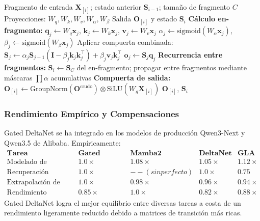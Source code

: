\documentclass[11pt,a4paper]{article}
\begin{document}
\begin{algorithm}[H]
\caption{Paso Adelante Paralelo por Fragmentos de Gated DeltaNet}
\begin{algorithmic}[1]
\Require Fragmento de entrada $\mathbf{X}_{[i]}$; estado anterior $\mathbf{S}_{i-1}$; tamaño de fragmento $C$
\Require Proyecciones: $W_q, W_k, W_v, W_\alpha, W_\beta$
\Ensure Salida $\mathbf{O}_{[i]}$ y estado $\mathbf{S}_i$
\State \textbf{Cálculo en-fragmento:}
    \State $\mathbf{q}_j \gets W_q \mathbf{x}_j$, $\mathbf{k}_j \gets W_k \mathbf{x}_j$, $\mathbf{v}_j \gets W_v \mathbf{x}_j$
    \State $\alpha_j \gets \text{sigmoid}(W_\alpha \mathbf{x}_j)$, $\beta_j \gets \text{sigmoid}(W_\beta \mathbf{x}_j)$
    \State Aplicar compuerta combinada: $\mathbf{S}_j \gets \alpha_j \mathbf{S}_{j-1}(\mathbf{I} - \beta_j \mathbf{k}_j \mathbf{k}_j^\top) + \beta_j \mathbf{v}_j \mathbf{k}_j^\top$
    \State $\mathbf{o}_j \gets \mathbf{S}_j \mathbf{q}_j$
\EndFor
\State \textbf{Recurrencia entre fragmentos:}
\State $\mathbf{S}_i \gets \mathbf{S}_C$ del en-fragmento; propagar entre fragmentos mediante máscaras $\prod \alpha$ acumulativas
\State \textbf{Compuerta de salida:} $\mathbf{O}_{[i]} \gets \text{GroupNorm}(\mathbf{O}^\text{crudo}) \otimes \text{SiLU}(W_g \mathbf{X}_{[i]})$
\Return $\mathbf{O}_{[i]}$, $\mathbf{S}_i$
\end{algorithmic}
\end{algorithm}

\subsubsection{Rendimiento Empírico y Compensaciones}

Gated DeltaNet se ha integrado en los modelos de producción Qwen3-Next y Qwen3.5 de Alibaba. Empíricamente:
\[
\begin{array}{l|cccc}
\textbf{Tarea} & \textbf{Gated DeltaNet} & \textbf{Mamba2} & \textbf{DeltaNet} & \textbf{GLA} \\
\hline
\text{Modelado de Lenguaje} & \mathbf{1.0\times} & 1.08\times & 1.05\times & 1.12\times \\
\text{Recuperación Asociativa} & \mathbf{1.0\times} & --(sin perfecto) & \mathbf{1.0\times} & 0.75 \\
\text{Extrapolación de Longitud} & \mathbf{1.0\times} & 0.98\times & 0.96\times & 0.94\times \\
\text{Rendimiento (tokens/seg)} & 0.85\times & \mathbf{1.0\times} & 0.82\times & 0.88\times
\end{array}
\]
Gated DeltaNet logra el mejor equilibrio entre diversas tareas a costa de un rendimiento ligeramente reducido debido a matrices de transición más ricas.
\end{document}
